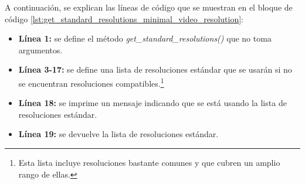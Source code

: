 A continuación, se explican las líneas de código que se muestran en el bloque de código \ref{lst:get_standard_resolutions_minimal_video_resolution}:
\begin{itemize}
    \item \textbf{Línea 1:} se define el método \textit{get\_standard\_resolutions()} que no toma argumentos.
    \item \textbf{Línea 3-17:} se define una lista de resoluciones estándar que se usarán si no se encuentran resoluciones compatibles.\footnote{Esta lista incluye resoluciones bastante comunes y que cubren un amplio rango de ellas.}
    \item \textbf{Línea 18:} se imprime un mensaje indicando que se está usando la lista de resoluciones estándar.
    \item \textbf{Línea 19:} se devuelve la lista de resoluciones estándar.
\end{itemize}
\vspace{\baselineskip}

